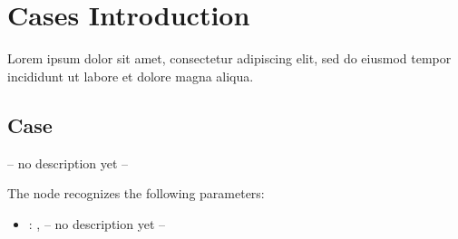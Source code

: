 \section{Cases Introduction}Lorem ipsum dolor sit amet, consectetur adipiscing elit, sed do eiusmod tempor incididunt ut labore et dolore magna aliqua.



\subsection{Case}
  -- no description yet --

  The  node recognizes the following parameters:
    \begin{itemize}
      \item {}: , 
        -- no description yet --
  \end{itemize}

